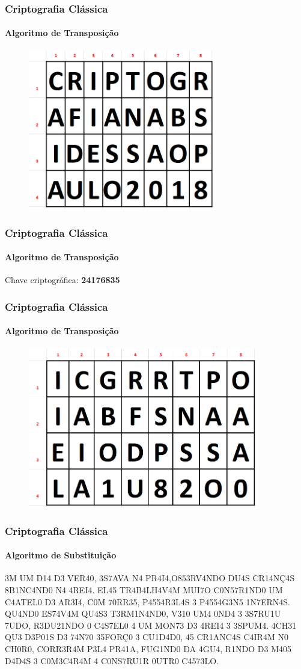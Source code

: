 \documentclass[compress]{beamer}
\begin{document}
\begin{frame}
\frametitle{Criptografia Clássica}
\framesubtitle{Algoritmo de Transposição}
	\begin{figure}[h]
		\includegraphics[width=\textwidth,height=7cm]{pics/tab_trans_1}
	\end{figure}
\end{frame}

\begin{frame}
\frametitle{Criptografia Clássica}
\framesubtitle{Algoritmo de Transposição}
\centering
Chave criptográfica: \textbf{24176835}
\end{frame}

\begin{frame}
\frametitle{Criptografia Clássica}
\framesubtitle{Algoritmo de Transposição}
\begin{figure}[h]
	\includegraphics[width=\textwidth,height=7cm]{pics/tab_trans_2}
\end{figure}
\end{frame}

\begin{frame}
\frametitle{Criptografia Clássica}
\framesubtitle{Algoritmo de Substituição}
\justifying
3M UM D14 D3 VER40, 3S7AVA N4 PR4I4,O853RV4NDO DU4S CR14NÇ4S 8B1NC4ND0 N4 4REI4. EL45 TR4B4LH4V4M MUI7O C0N57R1ND0 UM C4ATEL0 D3 AR3I4, C0M 70RR35, P4554R3L4S 3 P4554G3N5 1N7ERN4S. QU4ND0 ES74V4M QU4S3 T3RM1N4ND0, V310 UM4 0ND4 3 3S7RU1U 7UDO, R3DU21NDO 0 C4S7EL0 4 UM MON73 D3 4REI4 3 3SPUM4. 4CH31 QU3 D3P01S D3 74N70 35FORÇ0 3 CU1D4D0, 45 CR1ANC4S C4IR4M N0 CH0R0,
CORR3R4M P3L4 PR41A, FUG1ND0 DA 4GU4, R1NDO D3 M405 D4D4S 3 C0M3C4R4M 4 C0NS7RU1R 0UTR0 C4573LO. 
\end{frame}
\end{document}
